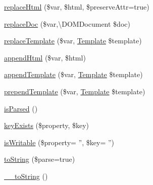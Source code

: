 \begin{DoxyCompactItemize}
\item 
\hyperlink{classDom_1_1Template_a9ccd2ca0e654a0cc83cfb342987bc7c4}{replace\+Html} (\$var, \$html, \$preserve\+Attr=true)
\item 
\hyperlink{classDom_1_1Template_a26342f174dd79804e59efaf26484c63b}{replace\+Doc} (\$var,\textbackslash{}D\+O\+M\+Document \$doc)
\item 
\hyperlink{classDom_1_1Template_a64b5538ca068e575db7681dd7c469d4a}{replace\+Template} (\$var, \hyperlink{classDom_1_1Template}{Template} \$template)
\item 
\hyperlink{classDom_1_1Template_abd523f4b4a23a0f99f0e10424a757375}{append\+Html} (\$var, \$html)
\item 
\hyperlink{classDom_1_1Template_ac24b82828c70a0df894134911f7c7aa0}{append\+Template} (\$var, \hyperlink{classDom_1_1Template}{Template} \$template)
\item 
\hyperlink{classDom_1_1Template_affe6cbb40a225b87cdbeee2b55baf97b}{prepend\+Template} (\$var, \hyperlink{classDom_1_1Template}{Template} \$template)
\item 
\hyperlink{classDom_1_1Template_a6f0608d05dc2f221bc96dde69b3195bc}{is\+Parsed} ()
\item 
\hyperlink{classDom_1_1Template_a17b6eb397d7a63dd9538a905575b2278}{key\+Exists} (\$property, \$key)
\item 
\hyperlink{classDom_1_1Template_aa3ca027975b922fffdc123de739d5f91}{is\+Writable} (\$property= '', \$key= '')
\item 
\hyperlink{classDom_1_1Template_a79eae9363c6cb25fe9df5a46c4a73608}{to\+String} (\$parse=true)
\item 
\hyperlink{classDom_1_1Template_a8028b6004a57794e1869227b0b06f43f}{\+\_\+\+\_\+to\+String} ()
\end{DoxyCompactItemize}
